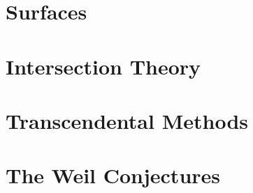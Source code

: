 \documentclass[oneside,openany]{book}
\newcommand{\combinedpagefooter}{%
    \thispagestyle{empty}%
    \begin{tikzpicture}[remember picture,overlay]
        \node[
            fill=white,
            minimum width=3cm,
            minimum height=0.6in,
            inner sep=0pt,
            font=\normalfont\normalsize
        ] at ([yshift=0.55in]current page.south)
        {\thepage};
    \end{tikzpicture}%
}
\begin{document}
\setcounter{section}{4}


\setcounter{section}{5}


\setcounter{chapter}{4}
\chapter{Surfaces}

\setcounter{section}{0}


\setcounter{section}{1}


\setcounter{section}{2}


\setcounter{section}{3}


\setcounter{section}{4}


\setcounter{section}{5}


\appendix

\setcounter{chapter}{0}
\chapter{Intersection Theory}\label{app:A}



\setcounter{chapter}{1}
\chapter{Transcendental Methods}\label{app:B}



\setcounter{chapter}{2}
\chapter{The Weil Conjectures}\label{app:C}


\end{document}
